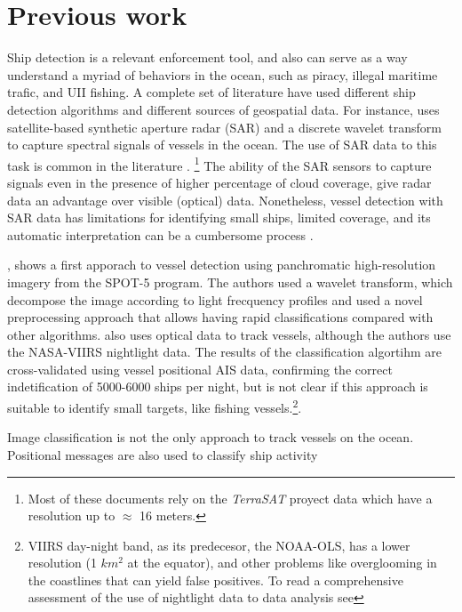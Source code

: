 \section{Previous work}

Ship detection is a relevant enforcement tool, and also can serve as a way understand a myriad of behaviors in the ocean, such as piracy, illegal 
maritime trafic, and UII fishing. A complete set of literature have used different ship detection algorithms and different sources of geospatial
data. For instance,  uses satellite-based synthetic aperture radar (SAR) and a discrete wavelet transform to capture spectral 
signals of vessels in the ocean. The use of SAR data to this task is common in the literature \cite{Margarit2009, Brusch2011, Corbane2008, Paes2010}.
\footnote{Most of these documents rely on the \textit{TerraSAT} proyect data which have a resolution up to $\approx$ 16 meters.} The ability of the SAR 
sensors to capture signals even in the presence of higher percentage of cloud coverage, give radar data an advantage over visible (optical) data. 
Nonetheless, vessel detection with SAR data has limitations for identifying small ships, limited coverage, and its automatic interpretation can be a 
cumbersome process \cite{Zhang2006}.  

, shows a first apporach to vessel detection using panchromatic high-resolution imagery from the SPOT-5 program. The authors used 
a wavelet transform, which decompose the image according to light frecquency profiles and used a novel preprocessing approach that allows having rapid 
classifications compared with other algorithms.  also uses optical data to track vessels, although the authors use the NASA-VIIRS 
nightlight data. The results of the classification algortihm are cross-validated using vessel positional AIS data, confirming the correct indetification 
of 5000-6000 ships per night, but is not clear if this approach is suitable to identify small targets, like fishing vessels.\footnote{VIIRS day-night 
band, as its predecesor, the NOAA-OLS, has a lower resolution (1 $km^{2}$ at the equator), and other problems like overglooming in the coastlines that 
can yield false positives. To read a comprehensive assessment of the use of nightlight data to data analysis see }.

Image classification is not the only approach to track vessels on the ocean. Positional messages are also used to classify ship activity 


